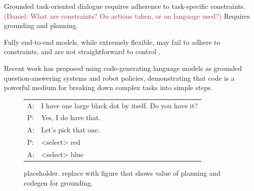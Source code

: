 \documentclass[11pt]{article}
\newcommand{\daniel}[1]{{{\textcolor{brown}{(Daniel: #1)}}}}
\begin{document}
Grounded task-oriented dialogue requires adherence to task-specific constraints. \daniel{What are constraints? On actions taken, or on language used?}
Requires grounding and planning.

Fully end-to-end models, while extremely flexible, may fail to adhere to constraints,
and are not straightforward to control \citep{vipergpt}.

Recent work has proposed using code-generating language models as grounded question-answering systems
and robot policies,
demonstrating that code is a powerful medium for breaking down complex tasks into simple steps.

\begin{figure}[t!]
\setlength{\abovecaptionskip}{0pt}

\centering


\vspace{1em}

\small
\begin{tabular}[b]{@{}l@{}l@{}}
\toprule
{\color{blue} A}:\;&I have one large black dot by itself. Do you have it? \\
{\color{red} P}:\;&Yes, I do have that. \\
{\color{blue} A}:\;&Let's pick that one. \\
{\color{red} P}:\;&<select> {\color{red} red} \\
{\color{blue} A}:\;&<select> {\color{blue} blue}\\
\bottomrule
\end{tabular}

\vspace{1em}

\caption{
placeholder. replace with figure that shows value of planning
and codegen for grounding.
}
\label{fig:oc}
\end{figure}
\end{document}
